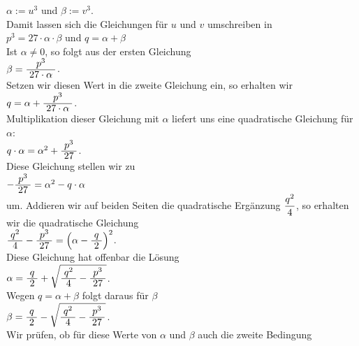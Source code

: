 \hspace*{1.3cm}
$\alpha := u^3$ \quad und \quad $\beta := v^3$.
\\[0.2cm]
Damit lassen sich die Gleichungen f\"{u}r $u$ und $v$ umschreiben in
\\[0.2cm]
\hspace*{1.3cm}
$p^3 = 27 \cdot \alpha \cdot \beta$ \quad und \quad $q = \alpha + \beta$
\\[0.2cm]
Ist $\alpha \not= 0$, so folgt aus der ersten Gleichung
\\[0.2cm]
\hspace*{1.3cm}
$\beta = \bruch{p^3}{27 \cdot \alpha}$.
\\[0.2cm]
Setzen wir diesen Wert in die zweite Gleichung ein, so erhalten wir
\\[0.2cm]
\hspace*{1.3cm}
$q = \alpha + \bruch{p^3}{27 \cdot \alpha}$.
\\[0.2cm]
Multiplikation dieser Gleichung mit $\alpha$ liefert uns eine quadratische Gleichung f\"{u}r $\alpha$:
\\[0.2cm]
\hspace*{1.3cm}
$q \cdot \alpha = \alpha^2 + \bruch{p^3}{27}$.
\\[0.2cm]
Diese Gleichung stellen wir zu 
\\[0.2cm]
\hspace*{1.3cm}
$- \bruch{p^3}{27} = \alpha^2 - q \cdot \alpha$
\\[0.2cm]
um.  Addieren wir auf beiden Seiten die quadratische Erg\"{a}nzung $\displaystyle\frac{q^2}{4}$, so erhalten wir
die quadratische Gleichung
\\[0.2cm]
\hspace*{1.3cm}
$\bruch{q^2}{4} - \bruch{p^3}{27} = \left(\alpha - \bruch{q}{2}\right)^2$.
\\[0.2cm]
Diese Gleichung hat offenbar die L\"{o}sung
\\[0.2cm]
\hspace*{1.3cm}
$\alpha = \bruch{q}{2} + \sqrt{\bruch{q^2}{4} - \bruch{p^3}{27}}$.
\\[0.2cm]
Wegen $q = \alpha + \beta$ folgt daraus f\"{u}r $\beta$
\\[0.2cm]
\hspace*{1.3cm}
$\beta = \bruch{q}{2} - \sqrt{\bruch{q^2}{4} - \bruch{p^3}{27}}$.
\\[0.2cm]
Wir pr\"{u}fen, ob f\"{u}r diese Werte von $\alpha$ und $\beta$ auch die zweite Bedingung 
\\[0.2cm]
\hspace*{1.3cm}
